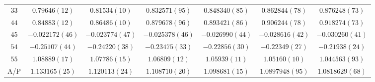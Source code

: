\begin{table}
\begin{center}
\begin{tabular}{c|c c c c c c}
$33$ & $0.79646(12)$ & $0.81534(10)$ & $0.832571(95)$ & $0.848340(85)$ & $0.862844(78)$ & $0.876248(73)$ \\
$44$ & $0.84883(12)$ & $0.86486(10)$ & $0.879678(96)$ & $0.893421(86)$ & $0.906244(78)$ & $0.918274(73)$ \\
$45$ & $-0.022172(46)$ & $-0.023774(47)$ & $-0.025378(46)$ & $-0.026990(44)$ & $-0.028616(42)$ & $-0.030260(41)$ \\
$54$ & $-0.25107(44)$ & $-0.24220(38)$ & $-0.23475(33)$ & $-0.22856(30)$ & $-0.22349(27)$ & $-0.21938(24)$ \\
$55$ & $1.08889(17)$ & $1.07786(15)$ & $1.06809(12)$ & $1.05939(11)$ & $1.05160(10)$ & $1.044563(93)$ \\
\hline
A/P & $1.133165(25)$ & $1.120113(24)$ & $1.108710(20)$ & $1.098681(15)$ & $1.0897948(95)$ & $1.0818629(68)$ \\
\hline
\hline
\end{tabular}
\end{center}
\end{table}